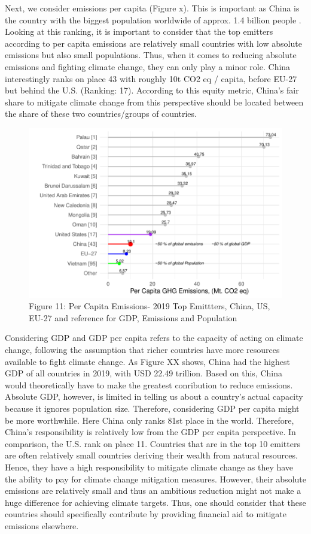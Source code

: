 \documentclass[
  12pt,
]{article}
\numberwithin{equation}{section}
\numberwithin{table}{section}
\numberwithin{figure}{section}
\begin{document}
Next, we consider emissions per capita (Figure x). This is important as
China is the country with the biggest population worldwide of approx.
1.4 billion people \citep{WorldBank2022c}. Looking at this ranking, it
is important to consider that the top emitters according to per capita
emissions are relatively small countries with low absolute emissions but
also small populations. Thus, when it comes to reducing absolute
emissions and fighting climate change, they can only play a minor role.
China interestingly ranks on place 43 with roughly 10t CO2 eq / capita,
before EU-27 but behind the U.S. (Ranking: 17). According to this equity
metric, China's fair share to mitigate climate change from this
perspective should be located between the share of these two
countries/groups of countries.

\begin{figure}
\centering
\includegraphics{Paper_files/figure-latex/unnamed-chunk-11-1.pdf}
\caption{Figure 11: Per Capita Emissions- 2019 \textbar{} Top Emittters,
China, US, EU-27 and reference for GDP, Emissions and Population}
\end{figure}

Considering GDP and GDP per capita refers to the capacity of acting on
climate change, following the assumption that richer countries have more
resources available to fight climate change. As Figure XX shows, China
had the highest GDP of all countries in 2019, with USD 22.49 trillion.
Based on this, China would theoretically have to make the greatest
conribution to reduce emissions. Absolute GDP, however, is limited in
telling us about a country's actual capacity because it ignores
population size. Therefore, considering GDP per capita might be more
worthwhile. Here China only ranks 81st place in the world. Therefore,
China's responsibility is relatively low from the GDP per capita
perspective. In comparison, the U.S. rank on place 11. Countries that
are in the top 10 emitters are often relatively small countries deriving
their wealth from natural resources. Hence, they have a high
responsibility to mitigate climate change as they have the ability to
pay for climate change mitigation measures. However, their absolute
emissions are relatively small and thus an ambitious reduction might not
make a huge difference for achieving climate targets. Thus, one should
consider that these countries should specifically contribute by
providing financial aid to mitigate emissions elsewhere.
\end{document}
